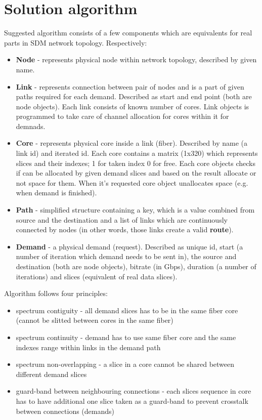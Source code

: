 \documentclass[conference]{IEEEtran}
\begin{document}
\section{Solution algorithm}
Suggested algorithm consists of a few components which are equivalents for real parts in SDM network topology. Respectively:
\begin{itemize}
\item \textbf{Node} - represents physical node within network topology, described by given name.
\item \textbf{Link} - represents connection between pair of nodes and is a part of given paths required for each demand. Described as start and end point (both are node objects). Each link consists of known number of cores. Link objects is programmed to take care of channel allocation for cores within it for demnads.
\item \textbf{Core} - represents physical core inside a link (fiber). Described by name (a link id) and iterated id. Each core contains a matrix (1x320) which represents slices and their indexes; 1 for taken index 0 for free. Each core objects checks if can be allocated by given demand slices and based on the result allocate or not space for them. When it's requested core object unallocates space (e.g. when demand is finished).
\item \textbf{Path} - simplified structure containing a key, which is a value combined from source and the destination and a list of links which are continuously connected by nodes (in other words, those links create a valid \textbf{route}).
\item \textbf{Demand} - a physical demand (request). Described as unique id, start (a number of iteration which demand needs to be sent in), the source and destination (both are node objects), bitrate (in Gbps), duration (a number of iterations) and slices (equivalent of real data slices).
\end{itemize}
Algorithm follows four principles:
\begin{itemize}
\item spectrum contiguity - all demand slices has to be in the same fiber core (cannot be slitted between cores in the same fiber)
\item spectrum continuity - demand has to use same fiber core and the same indexes range within links in the demand path
\item spectrum non-overlapping - a slice in a core cannot be shared between different demand slices
\item guard-band between neighbouring connections - each slices sequence in core has to have additional one slice taken as a guard-band to prevent crosstalk between connections (demands)
\end{itemize}
\end{document}

